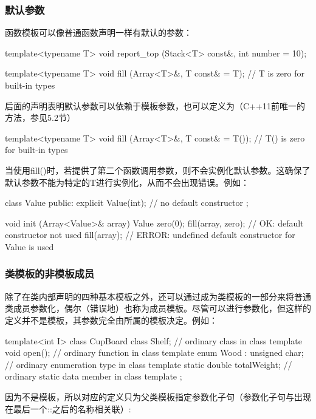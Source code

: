 \subsubsection{默认参数}

函数模板可以像普通函数声明一样有默认的参数：

\begin{cpp}
template<typename T>
void report_top (Stack<T> const&, int number = 10);

template<typename T>
void fill (Array<T>&, T const& = T{}); // T{} is zero for built-in types
\end{cpp}

后面的声明表明默认参数可以依赖于模板参数，也可以定义为（C++11前唯一的方法，参见5.2节）

\begin{cpp}
template<typename T>
void fill (Array<T>&, T const& = T()); // T() is zero for built-in types
\end{cpp}

当使用fill()时，若提供了第二个函数调用参数，则不会实例化默认参数。这确保了默认参数不能为特定的T进行实例化，从而不会出现错误。例如：

\begin{cpp}
class Value {
public:
	explicit Value(int); // no default constructor
};

void init (Array<Value>& array)
{
	Value zero(0);
	fill(array, zero); // OK: default constructor not used
	fill(array); // ERROR: undefined default constructor for Value is used
}
\end{cpp}

\subsubsection{类模板的非模板成员}

除了在类内部声明的四种基本模板之外，还可以通过成为类模板的一部分来将普通类成员参数化，偶尔（错误地）也称为成员模板。尽管可以进行参数化，但这样的定义并不是模板，其参数完全由所属的模板决定。例如：

\begin{cpp}
template<int I>
class CupBoard
{
	class Shelf; // ordinary class in class template
	void open(); // ordinary function in class template
	enum Wood : unsigned char; // ordinary enumeration type in class template
	static double totalWeight; // ordinary static data member in class template
};
\end{cpp}

因为不是模板，所以对应的定义只为父类模板指定参数化子句（参数化子句与出现在最后一个::之后的名称相关联）:

